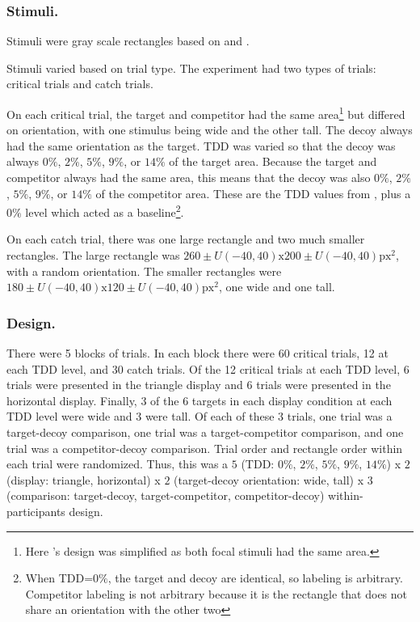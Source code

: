\subsubsection{Stimuli.}
Stimuli were gray scale rectangles based on \textcite{trueblood2013not} and \textcite{spektorWhenGoodLooks2018b}. 

Stimuli varied based on trial type. The experiment had two types of trials: critical trials and catch trials.

On each critical trial, the target and competitor had the same area\footnote{Here \textcite{spektorWhenGoodLooks2018b}'s design was simplified as both focal stimuli had the same area.} but differed on orientation, with one stimulus being wide and the other tall. The decoy always had the same orientation as the target. TDD was varied so that the decoy was always $0\%$, $2\%$, $5\%$, $9\%$, or $14\%$ of the target area. Because the target and competitor always had the same area, this means that the decoy was also $0\%$, $2\%$, $5\%$, $9\%$, or $14\%$ of the competitor area. These are the TDD values from \textcite{spektorWhenGoodLooks2018b}, plus a $0\%$ level which acted as a baseline\footnote{When TDD=$0\%$, the target and decoy are identical, so labeling is arbitrary. Competitor labeling is not arbitrary because it is the rectangle that does not share an orientation with the other two}.

On each catch trial, there was one large rectangle and two much smaller rectangles. The large rectangle was $260 \pm U(-40, 40) \text{x} 200 \pm U(-40, 40) \text{px}^2$, with a random orientation. The smaller rectangles were $180 \pm U(-40, 40) \text{x} 120 \pm U(-40, 40) \text{px}^2$, one wide and one tall.

\subsubsection{Design.}
There were 5 blocks of trials. In each block there were 60 critical trials, 12 at each TDD level, and 30 catch trials. Of the 12 critical trials at each TDD level, 6 trials were presented in the triangle display and 6 trials were presented in the horizontal display. Finally, 3 of the 6 targets in each display condition at each TDD level were wide and 3 were tall. Of each of these 3 trials, one trial was a target-decoy comparison, one trial was a target-competitor comparison, and one trial was a competitor-decoy comparison. Trial order and rectangle order within each trial were randomized. Thus, this was a $5$ (TDD: $0\%$, $2\%$, $5\%$, $9\%$, $14\%$) x $2$ (display: triangle, horizontal) x $2$ (target-decoy orientation: wide, tall) x $3$ (comparison: target-decoy, target-competitor, competitor-decoy) within-participants design. 

